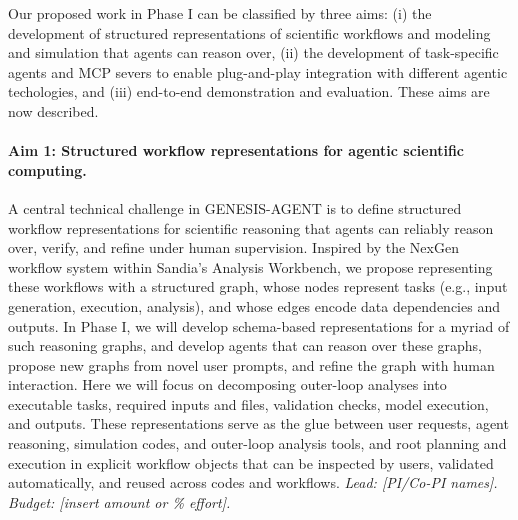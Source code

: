 \documentclass[11pt]{article} \usepackage[margin=1in]{geometry}
\newcommand{\bertmargin}[1]{\marginpar{\fontsize{6pt}{6pt}\selectfont\raggedright\textcolor{cyan}{BJD: #1}}}
\newcommand{\wyattmargin}[1]{\marginpar{\fontsize{6pt}{6pt}\selectfont\raggedright\textcolor{green}{WJH: #1}}}
\begin{document}
Our proposed work in Phase I can be classified by three aims: (i) the development of structured representations of scientific workflows and modeling and simulation that agents can reason over, (ii) the development of task-specific agents and MCP severs to enable plug-and-play integration with different agentic techologies, and (iii) end-to-end demonstration and evaluation. These aims are now described. 
\paragraph{Aim 1: Structured workflow representations for agentic scientific computing.} A central technical challenge in GENESIS-AGENT is to define structured workflow representations for scientific reasoning that agents can reliably reason over, verify, and refine under human supervision. 
Inspired by the NexGen workflow system within Sandia's Analysis Workbench, we propose representing these workflows with a structured graph, whose nodes represent tasks (e.g., input generation, execution, analysis), and whose edges encode data dependencies and outputs. In Phase I, we will develop schema-based representations for a myriad of such reasoning graphs, and develop agents that can reason over these graphs, propose new graphs from novel user prompts, and refine the graph with human interaction. Here we will 
focus on decomposing outer-loop analyses into executable tasks, required inputs and files, validation checks, model execution, and outputs. These representations serve as the glue between user requests, agent reasoning, simulation codes, and outer-loop analysis tools, and root planning and execution in explicit workflow objects that can be inspected by users, validated automatically, and reused across codes and workflows.
\textit{Lead:
[PI/Co-PI names]. Budget: [insert amount or \% effort].}
\end{document}
